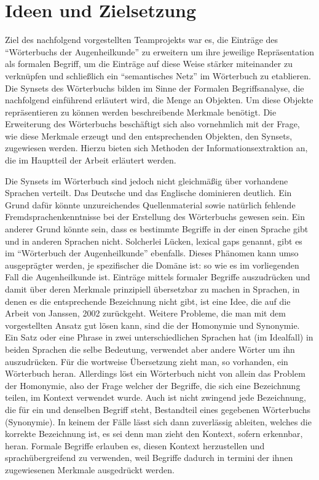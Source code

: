 \documentclass[pagesize,paper=A4,DIV=calc,fontsize=12pt,draft=false]{scrreprt}
\begin{document}
\section{Ideen und Zielsetzung}

Ziel des nachfolgend vorgestellten Teamprojekts war es, die Einträge des \enquote{Wörterbuchs der Augenheilkunde} zu erweitern um ihre jeweilige Repräsentation als formalen Begriff, um die Einträge auf diese Weise stärker miteinander zu verknüpfen und schließlich ein \enquote{semantisches Netz} im Wörterbuch zu etablieren. 
Die Synsets des Wörterbuchs bilden im Sinne der Formalen Begriffsanalyse, die nachfolgend einführend erläutert wird, die Menge an Objekten. 
Um diese Objekte repräsentieren zu können werden beschreibende Merkmale benötigt. 
Die Erweiterung des Wörterbuchs beschäftigt sich also vornehmlich mit der Frage, wie diese Merkmale erzeugt und den entsprechenden Objekten, den Synsets, zugewiesen werden. 
Hierzu bieten sich Methoden der Informationsextraktion an, die im Hauptteil der Arbeit erläutert werden. 

Die Synsets im Wörterbuch sind jedoch nicht gleichmäßig über vorhandene Sprachen verteilt. 
Das Deutsche und das Englische dominieren deutlich. 
Ein Grund dafür könnte unzureichendes Quellenmaterial sowie natürlich fehlende Fremdsprachenkenntnisse bei der Erstellung des Wörterbuchs gewesen sein. 
Ein anderer Grund könnte sein, dass es bestimmte Begriffe in der einen Sprache gibt und in anderen Sprachen nicht. 
Solcherlei Lücken, lexical gaps genannt, gibt es im \enquote{Wörterbuch der Augenheilkunde} ebenfalls. 
Dieses Phänomen kann umso ausgeprägter werden, je spezifischer die Domäne ist: so wie es im vorliegenden Fall die Augenheilkunde ist. 
Einträge mittels formaler Begriffe auszudrücken und damit über deren Merkmale prinzipiell übersetzbar zu machen in Sprachen, in denen es die entsprechende Bezeichnung nicht gibt, ist eine Idee, die auf die Arbeit von Janssen, 2002 zurückgeht.  
Weitere Probleme, die man mit dem vorgestellten Ansatz gut lösen kann, sind die der Homonymie und Synonymie. 
Ein Satz oder eine Phrase in zwei unterschiedlichen Sprachen hat (im Idealfall) in beiden Sprachen die selbe Bedeutung, verwendet aber andere Wörter um ihn auszudrücken. 
Für die wortweise Übersetzung zieht man, so vorhanden, ein Wörterbuch heran. 
Allerdings löst ein Wörterbuch nicht von allein das Problem der Homonymie, also der Frage welcher der Begriffe, die sich eine Bezeichnung teilen, im Kontext verwendet wurde. 
Auch ist nicht zwingend jede Bezeichnung, die für ein und denselben Begriff steht, Bestandteil eines gegebenen Wörterbuchs (Synonymie). 
In keinem der Fälle lässt sich dann zuverlässig ableiten, welches die korrekte Bezeichnung ist, es sei denn man zieht den Kontext, sofern erkennbar, heran. 
Formale Begriffe erlauben es, diesen Kontext herzustellen und sprachübergreifend zu verwenden, weil Begriffe dadurch in termini der ihnen zugewiesenen Merkmale ausgedrückt werden. 
\end{document}
